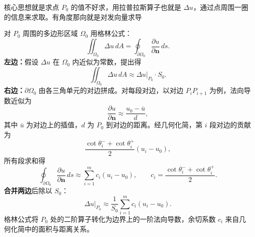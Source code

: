 \begin{dxtips}
   核心思想就是求点 $P_0$ 的值不好求，用拉普拉斯算子也就是 $\Delta u$，通过点周围一圈的信息来求取。有角度那向就是对发向量求导
\end{dxtips}
\begin{note}[从格林公式到差分格式]
对 $P_0$ 周围的多边形区域 $\Omega_0$ 用格林公式：
\[
\iint_{\Omega_0} \Delta u \, dA = \oint_{\partial \Omega_0} \frac{\partial u}{\partial \mathbf{n}} \, ds.
\]
\textbf{左边：}假设 $\Delta u$ 在 $\Omega_0$ 内近似为常数，提出得
\[
\iint_{\Omega_0} \Delta u \, dA \approx \Delta u\big|_{P_0} \cdot S_0.
\]
\textbf{右边：}$\partial\Omega_0$ 由各三角单元的对边拼成。对每段对边，以对边 $P_iP_{i+1}$ 为例，法向导数近似为
\[
\frac{\partial u}{\partial \mathbf{n}} \approx \frac{u_0 - \bar{u}}{d},
\]
其中 $\bar{u}$ 为对边上的插值，$d$ 为 $P_0$ 到对边的距离。经几何化简，第 $i$ 段对边的贡献为
\[
\frac{\cot\theta_i^- + \cot\theta_i^+}{2}(u_i - u_0),
\]
所有段求和得
\[
\oint_{\partial \Omega_0} \frac{\partial u}{\partial \mathbf{n}} \, ds \approx \sum_{i=1}^{m} c_i(u_i - u_0), \qquad c_i = \frac{\cot\theta_i^- + \cot\theta_i^+}{2}.
\]
\textbf{合并两边}后除以 $S_0$：
\[
\boxed{\Delta u\big|_{P_0} \approx \frac{1}{S_0}\sum_{i=1}^{m} c_i(u_i - u_0).}
\]
格林公式将 $P_0$ 处的二阶算子转化为边界上的一阶法向导数，余切系数 $c_i$ 来自几何化简中的面积与距离关系。
\end{note}

